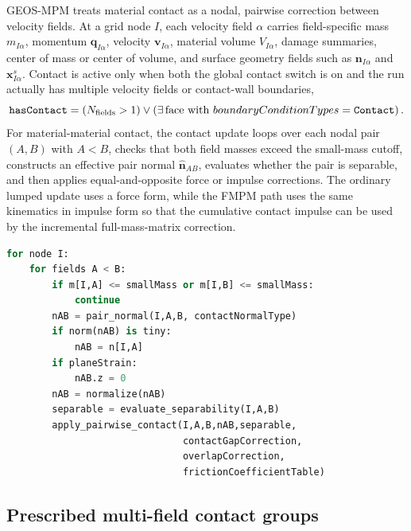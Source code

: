 GEOS-MPM treats material contact as a nodal, pairwise correction between velocity fields.  At a grid node $I$, each velocity field $\alpha$ carries field-specific mass $m_{I\alpha}$, momentum $\mathbf{q}_{I\alpha}$, velocity $\mathbf{v}_{I\alpha}$, material volume $V_{I\alpha}$, damage summaries, center of mass or center of volume, and surface geometry fields such as $\mathbf{n}_{I\alpha}$ and $\mathbf{x}^{s}_{I\alpha}$.  Contact is active only when both the global contact switch is on and the run actually has multiple velocity fields or contact-wall boundaries,
\begin{equation}
  \texttt{hasContact} =
  \left(N_{\mathrm{fields}}>1\right)
  \lor
  \left(\exists\,\hbox{face with }boundaryConditionTypes=\texttt{Contact}\right).
\end{equation}
For material-material contact, the contact update loops over each nodal pair $(A,B)$ with $A<B$, checks that both field masses exceed the small-mass cutoff, constructs an effective pair normal $\hat{\mathbf{n}}_{AB}$, evaluates whether the pair is separable, and then applies equal-and-opposite force or impulse corrections.  The ordinary lumped update uses a force form, while the FMPM path uses the same kinematics in impulse form so that the cumulative contact impulse can be used by the incremental full-mass-matrix correction.

\begin{lstlisting}[language=Python,caption={Solver-level material contact loop.}]
for node I:
    for fields A < B:
        if m[I,A] <= smallMass or m[I,B] <= smallMass:
            continue
        nAB = pair_normal(I,A,B, contactNormalType)
        if norm(nAB) is tiny:
            nAB = n[I,A]
        if planeStrain:
            nAB.z = 0
        nAB = normalize(nAB)
        separable = evaluate_separability(I,A,B)
        apply_pairwise_contact(I,A,B,nAB,separable,
                               contactGapCorrection,
                               overlapCorrection,
                               frictionCoefficientTable)
\end{lstlisting}

\subsection{Prescribed multi-field contact groups}
\label{subsec:prescribed-multifield-contact}

